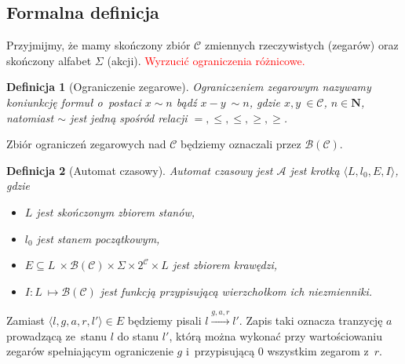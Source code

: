 \documentclass{pracamgr}
\newcommand{\todo}[1]{\textcolor{red}{#1}}
\theoremstyle{plain}
\newtheorem{definition}{Definicja}
\begin{document}
\subsection{Formalna definicja} Przyjmijmy, że mamy skończony zbiór
$\mathcal{C}$ zmiennych rzeczywistych (zegarów) oraz skończony alfabet
$\Sigma$ (akcji).
\todo{Wyrzucić ograniczenia różnicowe.}
\begin{definition}[Ograniczenie zegarowe] Ograniczeniem zegarowym
nazywamy koniunkcję formuł o~postaci $x \sim n$ bądź $x - y~\sim n$,
gdzie $x, y~\in \mathcal{C}$, $n \in \mathbf{N}$, natomiast $\sim$
jest jedną spośród relacji $=, \le, \leq, \ge, \geq$.
\end{definition}
Zbiór ograniczeń zegarowych nad $\mathcal{C}$ będziemy oznaczali przez
$\mathcal{B}(\mathcal{C})$.

\begin{definition}[Automat czasowy] Automat czasowy jest $\mathcal{A}$
jest krotką $\langle L, l_0, E, I\rangle$, gdzie
  \begin{itemize}
    \item $L$ jest skończonym zbiorem stanów,
    \item $l_0$ jest stanem początkowym,
    \item $E \subseteq L~\times \mathcal{B}(\mathcal{C}) \times \Sigma
    \times 2^{\mathcal{C}} \times L$ jest zbiorem krawędzi,
    \item $I: L~\mapsto \mathcal{B}(\mathcal{C})$ jest funkcją
    przypisującą wierzchołkom ich niezmienniki.
  \end{itemize}
\end{definition}
Zamiast $\langle l, g, a, r, l' \rangle \in E$ będziemy pisali $l
\stackrel{g, a, r}{\longrightarrow} l'$. Zapis taki oznacza tranzycję
$a$ prowadzącą ze~stanu $l$ do stanu $l'$, którą można
wykonać przy wartościowaniu zegarów spełniającym ograniczenie $g$
i~przypisującą $0$ wszystkim zegarom z~$r$.
\end{document}
